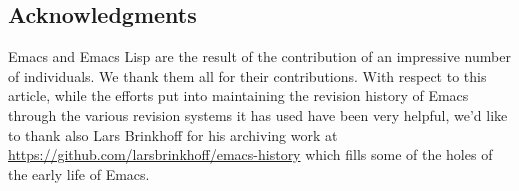 \documentclass[format=acmsmall, review]{acmart}
\newcommand \Elisp {Emacs Lisp}
\begin{document}

\subsection{Acknowledgments}

Emacs and \Elisp{} are the result of the contribution of an impressive
number of individuals.  We thank them all for their contributions.
With respect to this article, while the efforts put into maintaining the
revision history of Emacs through the various revision systems it has used
have been very helpful, we'd like to thank also Lars Brinkhoff for his
archiving work at \url{https://github.com/larsbrinkhoff/emacs-history} which
fills some of the holes of the early life of Emacs.



\end{document}
